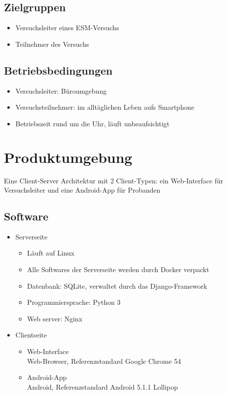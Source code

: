 \documentclass[a4paper]{scrreprt}
\begin{document}
        \section{Zielgruppen}
            \begin{itemize}
                \item Versuchsleiter eines ESM-Versuchs
                \item Teilnehmer des Versuchs
            \end{itemize}

        \section{Betriebsbedingungen}
            \begin{itemize}
                \item Versuchsleiter: Büroumgebung
                \item Versuchsteilnehmer: im alltäglichen Leben aufs Smartphone
                \item Betriebszeit rund um die Uhr, läuft unbeaufsichtigt
            \end{itemize}

    \chapter{Produktumgebung}
        Eine Client-Server Architektur mit 2 Client-Typen: ein Web-Interface für Versuchsleiter und eine Android-App für Probanden

        \section{Software}
            \begin{itemize}
                \item Serverseite
                    \begin{itemize}
                        \item  Läuft auf Linux
                        \item Alle Softwares der Serverseite werden durch Docker verpackt
                        \item Datenbank: SQLite, verwaltet durch das Django-Framework
                        \item Programmiersprache: Python 3
                        \item Web server: Nginx
                    \end{itemize}
                \item Clientseite
                    \begin{itemize}
                        \item Web-Interface\\
                             Web-Browser, Referenzstandard Google Chrome 54
                        \item  Android-App\\
                             Android, Referenzstandard Android 5.1.1 Lollipop
                    \end{itemize}
            \end{itemize}
\end{document}
